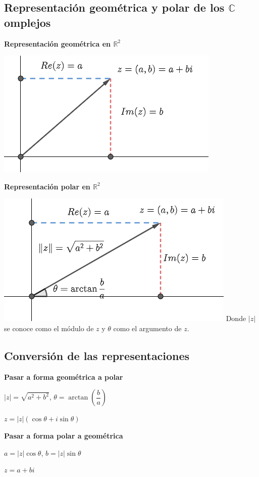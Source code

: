 \documentclass[12pt]{article}
\begin{document}
\subsection*{Representación geométrica y polar de los $\mathbb{C}$ omplejos}
\noindent\textbf{Representación geométrica en $\mathbb{R}^2$}
\begin{center}
    \includegraphics{imaginariosGeo.png}
\end{center}
\noindent\textbf{Representación polar en $\mathbb{R}^2$}
\begin{center}
    \includegraphics{imaginariosGeo1.png}\newline
    Donde $|z|$ se conoce como el módulo de $z$ y $\theta$ como el argumento de $z$.
\end{center}
\newpage
\subsection*{Conversión de las representaciones}
\noindent\textbf{Pasar a forma geométrica a polar}
\begin{center}
    $|z|=\sqrt{a^2+b^2}$, $\theta=\arctan{\left(\dfrac{b}{a}\right)}$    
\end{center}
\begin{center}
    $z=|z|(\cos{\theta}+i\sin{\theta})$
\end{center}
\textbf{Pasar a forma polar a geométrica}
\begin{center}
    $a=|z|\cos{\theta}$, $b=|z|\sin{\theta}$
\end{center}
\begin{center}
    $z=a+bi$
\end{center}
\end{document}
